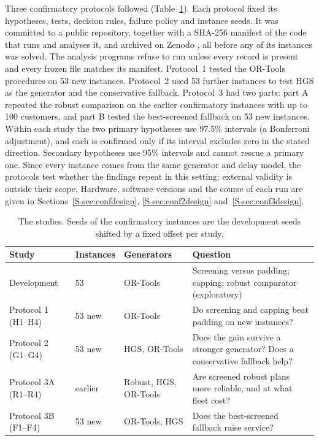 \documentclass{itor}
\begin{document}
Three confirmatory protocols followed (Table~\ref{tab:studies}). Each protocol fixed
its hypotheses, tests, decision rules, failure policy and instance seeds. It was
committed to a public repository, together with a \mbox{SHA-256} manifest of the code
that runs and analyses it, and archived on Zenodo
\citep{ali2026freeze,ali2026freeze2,ali2026freeze3}, all before any of its
instances was solved.
The analysis programs refuse to run unless every record is present and every
frozen file matches its manifest. Protocol~1 tested the OR-Tools procedures on
53 new instances. Protocol~2 used 53 further instances to test HGS as the
generator and the conservative fallback. Protocol~3 had two parts: part A
repeated the robust comparison on the \PaInstances{} earlier confirmatory
instances with up to 100 customers, and part B tested the best-screened fallback
on 53 new instances. Within each study the two primary hypotheses use 97.5\%
intervals (a Bonferroni adjustment), and each is confirmed only if its interval
excludes zero in the stated direction. Secondary hypotheses use 95\% intervals
and cannot rescue a primary one. Since every instance comes from the same
generator and delay model, the protocols test whether the findings repeat in
this setting; external validity is outside their scope. Hardware, software
versions and the course of each run are given in
Sections~\ref{S-sec:confdesign}, \ref{S-sec:conf2design}
and~\ref{S-sec:conf3design}.

\begin{table}[t]
\centering
\footnotesize
\caption{The studies. Seeds of the confirmatory instances are the development
seeds shifted by a fixed offset per study.}
\label{tab:studies}
\begin{tabular}{@{}lllp{6.2cm}@{}}
\toprule
Study & Instances & Generators & Question\\
\midrule
Development & 53 & OR-Tools & Screening versus padding; capping; robust comparator (exploratory)\\
Protocol 1 (H1--H4) & 53 new & OR-Tools & Do screening and capping beat padding on new instances?\\
Protocol 2 (G1--G4) & 53 new & HGS, OR-Tools & Does the gain survive a stronger generator? Does a conservative fallback help?\\
Protocol 3A (R1--R4) & \PaInstances{} earlier & Robust, HGS, OR-Tools & Are screened robust plans more reliable, and at what fleet cost?\\
Protocol 3B (F1--F4) & 53 new & OR-Tools, HGS & Does the best-screened fallback raise service?\\
\bottomrule
\end{tabular}
\end{table}
\end{document}
